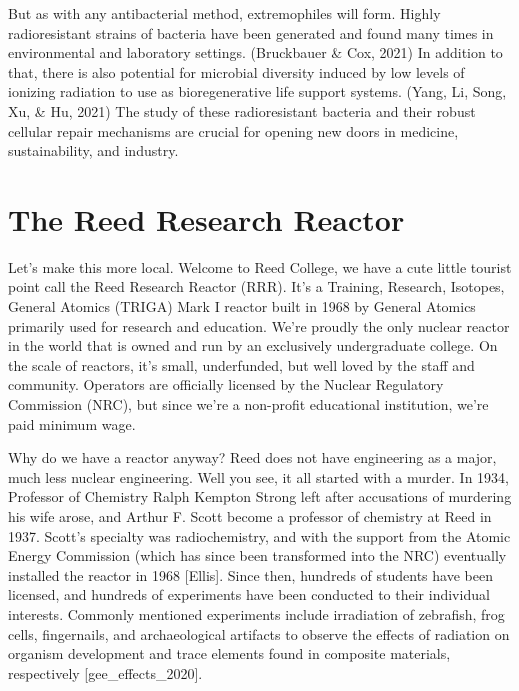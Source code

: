 \documentclass[12pt,twoside]{reedthesis}
\begin{document}
But as with any antibacterial method, extremophiles will form. Highly radioresistant strains of bacteria have been generated and found many times in environmental and laboratory settings. (Bruckbauer \& Cox, 2021) In addition to that, there is also potential for microbial diversity induced by low levels of ionizing radiation to use as bioregenerative life support systems. (Yang, Li, Song, Xu, \& Hu, 2021) The study of these radioresistant bacteria and their robust cellular repair mechanisms are crucial for opening new doors in medicine, sustainability, and industry.

\hypertarget{the-reed-research-reactor}{%
\section{The Reed Research Reactor}\label{the-reed-research-reactor}}

Let's make this more local. Welcome to Reed College, we have a cute little tourist point call the Reed Research Reactor (RRR). It's a Training, Research, Isotopes, General Atomics (TRIGA) Mark I reactor built in 1968 by General Atomics primarily used for research and education. We're proudly the only nuclear reactor in the world that is owned and run by an exclusively undergraduate college. On the scale of reactors, it's small, underfunded, but well loved by the staff and community. Operators are officially licensed by the Nuclear Regulatory Commission (NRC), but since we're a non-profit educational institution, we're paid minimum wage.

Why do we have a reactor anyway? Reed does not have engineering as a major, much less nuclear engineering. Well you see, it all started with a murder. In 1934, Professor of Chemistry Ralph Kempton Strong left after accusations of murdering his wife arose, and Arthur F. Scott become a professor of chemistry at Reed in 1937. Scott's specialty was radiochemistry, and with the support from the Atomic Energy Commission (which has since been transformed into the NRC) eventually installed the reactor in 1968 {[}Ellis{]}. Since then, hundreds of students have been licensed, and hundreds of experiments have been conducted to their individual interests. Commonly mentioned experiments include irradiation of zebrafish, frog cells, fingernails, and archaeological artifacts to observe the effects of radiation on organism development and trace elements found in composite materials, respectively {[}gee\_effects\_2020{]}.
\end{document}
